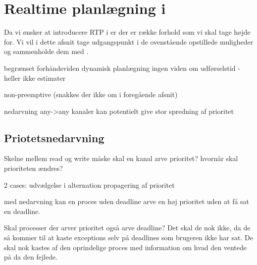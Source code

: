 \section{Realtime planlægning i \pycsp}
Da vi ønsker at introducere RTP i \pycsp er der er række forhold som vi skal tage højde for. Vi vil i dette afsnit tage udgangspunkt i de ovenstående opstillede muligheder og sammenholde dem med \pycsp. 

begrænset forhåndsviden 
  dynamisk planlægning
  ingen viden om udførselstid - heller ikke estimater  

non-preemptive (snakkes der ikke om i foregående afsnit)

nedarvning 
  any->any kanaler kan potentielt give stor spredning af prioritet

\subsection{Priotetsnedarvning}
Skelne mellem read og write
måske skal en kanal arve prioritet?
hvornår skal prioriteten ændres? 

2 cases:
udvælgelse i alternation
propagering af prioritet

med nedarvning kan en proces uden deadline arve en høj prioritet uden at få sat en deadline. 

Skal processer der arver prioritet også arve deadline? Det skal de nok ikke, da de så kommer til at kaste exceptions selv på deadlines som brugeren ikke har sat. De skal nok kastes af den oprindelige proces med information om hvad den ventede på da den fejlede. 



